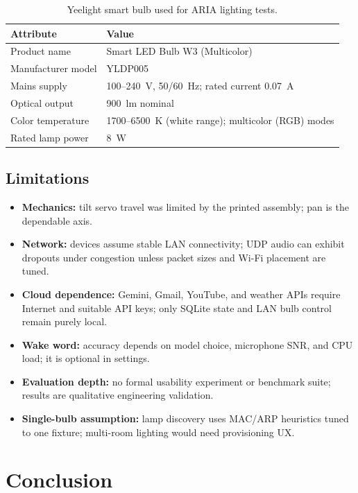 \documentclass[12pt,a4paper]{report}
\begin{document}
\begin{table}[htbp]
\centering
\caption{Yeelight smart bulb used for ARIA lighting tests.}
\label{tab:yeelight-bulb}
\begin{tabular}{@{}ll@{}}
\toprule
\textbf{Attribute} & \textbf{Value} \\
\midrule
Product name & Smart LED Bulb W3 (Multicolor) \\
Manufacturer model & YLDP005 \\
Mains supply & 100--240~V, 50/60~Hz; rated current 0.07~A \\
Optical output & 900~lm nominal \\
Color temperature & 1700--6500~K (white range); multicolor (RGB) modes \\
Rated lamp power & 8~W \\
\bottomrule
\end{tabular}
\end{table}

\section{Limitations}

\begin{itemize}
    \item \textbf{Mechanics:} tilt servo travel was limited by the printed assembly; pan is the dependable axis.
    \item \textbf{Network:} devices assume stable LAN connectivity; UDP audio can exhibit dropouts under congestion unless packet sizes and Wi-Fi placement are tuned.
    \item \textbf{Cloud dependence:} Gemini, Gmail, YouTube, and weather APIs require Internet and suitable API keys; only SQLite state and LAN bulb control remain purely local.
    \item \textbf{Wake word:} accuracy depends on model choice, microphone SNR, and CPU load; it is optional in settings.
    \item \textbf{Evaluation depth:} no formal usability experiment or benchmark suite; results are qualitative engineering validation.
    \item \textbf{Single-bulb assumption:} lamp discovery uses MAC/ARP heuristics tuned to one fixture; multi-room lighting would need provisioning UX.
\end{itemize}

\chapter{Conclusion}
\end{document}
